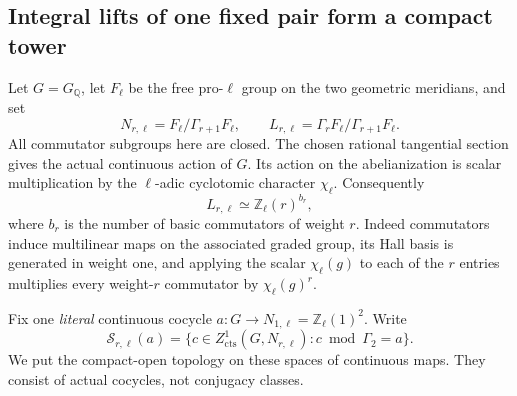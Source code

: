 \subsection{Integral lifts of one fixed pair form a compact tower}
\label{sec:ghost-compact-tower}

Let \(G=G_{\mathbb Q}\), let \(F_\ell\) be the free pro-\(\ell\)
group on the two geometric meridians, and set
\[
 N_{r,\ell}=F_\ell/\Gamma_{r+1}F_\ell,\qquad
 L_{r,\ell}=\Gamma_rF_\ell/\Gamma_{r+1}F_\ell.
\]
All commutator subgroups here are closed.  The chosen rational
tangential section gives the actual continuous action of \(G\).
Its action on the abelianization is scalar multiplication by the
\(\ell\)-adic cyclotomic character \(\chi_\ell\).  Consequently
\[
       L_{r,\ell}\simeq\mathbb Z_\ell(r)^{b_r},
       \tag{*}\label{eq:ghost-central-layer}
\]
where \(b_r\) is the number of basic commutators of weight \(r\).
Indeed commutators induce multilinear maps on the associated graded
group, its Hall basis is generated in weight one, and applying the
scalar \(\chi_\ell(g)\) to each of the \(r\) entries multiplies
every weight-\(r\) commutator by \(\chi_\ell(g)^r\).

Fix one \emph{literal} continuous cocycle
\(a:G\to N_{1,\ell}=\mathbb Z_\ell(1)^2\).  Write
\[
 \mathscr S_{r,\ell}(a)=
 \{c\in Z^1_{\mathrm{cts}}(G,N_{r,\ell}):c\bmod\Gamma_2=a\}.
\]
We put the compact-open topology on these spaces of continuous maps.
They consist of actual cocycles, not conjugacy classes.

